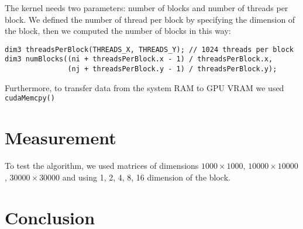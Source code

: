 \documentclass{article}
\begin{document}
The kernel needs two parameters: number of blocks and number of threads per block. We defined the number of thread per block by specifying the dimension of the block, then we computed the number of blocks in this way:

\begin{verbatim}
dim3 threadsPerBlock(THREADS_X, THREADS_Y); // 1024 threads per block
dim3 numBlocks((ni + threadsPerBlock.x - 1) / threadsPerBlock.x, 
               (nj + threadsPerBlock.y - 1) / threadsPerBlock.y);
\end{verbatim}  

Furthermore, to transfer data from the system RAM to GPU VRAM we used \texttt{cudaMemcpy()}

\section{Measurement}

To test the algorithm, we used matrices of dimensions $1000\times1000$, $10000\times10000$, $30000\times30000$ and using 1, 2, 4, 8, 16 dimension of the block.

\section{Conclusion}
\end{document}
